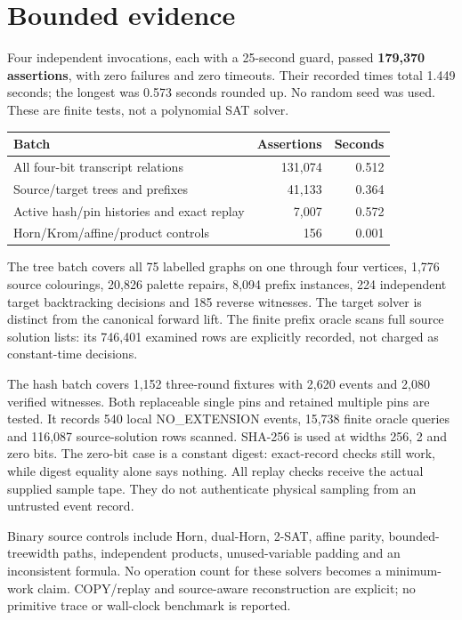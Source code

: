 \documentclass[11pt]{article}
\begin{document}
\section{Bounded evidence}
Four independent invocations, each with a 25-second guard, passed
\textbf{179,370 assertions}, with zero failures and zero timeouts. Their
recorded times total 1.449 seconds; the longest was 0.573 seconds rounded up.
No random seed was used. These are finite tests, not a polynomial SAT solver.
\begin{center}\small
\begin{tabular}{lrr}\toprule
Batch & Assertions & Seconds\\\midrule
All four-bit transcript relations &131,074&0.512\\
Source/target trees and prefixes &41,133&0.364\\
Active hash/pin histories and exact replay &7,007&0.572\\
Horn/Krom/affine/product controls &156&0.001\\\bottomrule
\end{tabular}\end{center}
The tree batch covers all 75 labelled graphs on one through four vertices,
1,776 source colourings, 20,826 palette repairs, 8,094 prefix instances,
224 independent target backtracking decisions and 185 reverse witnesses.
The target solver is distinct from the canonical forward lift. The finite
prefix oracle scans full source solution lists: its 746,401 examined rows
are explicitly recorded, not charged as constant-time decisions.

The hash batch covers 1,152 three-round fixtures with 2,620 events and 2,080
verified witnesses. Both replaceable single pins and retained multiple pins
are tested. It records 540 local NO\_EXTENSION events, 15,738 finite oracle
queries and 116,087 source-solution rows scanned. SHA-256 is used at widths
256, 2 and zero bits. The zero-bit case is a constant digest: exact-record
checks still work, while digest equality alone says nothing. All replay
checks receive the actual supplied sample tape. They do not authenticate
physical sampling from an untrusted event record.

Binary source controls include Horn, dual-Horn, 2-SAT, affine parity,
bounded-treewidth paths, independent products, unused-variable padding and
an inconsistent formula. No operation count for these solvers becomes a
minimum-work claim. COPY/replay and source-aware reconstruction are explicit;
no primitive trace or wall-clock benchmark is reported.
\end{document}
